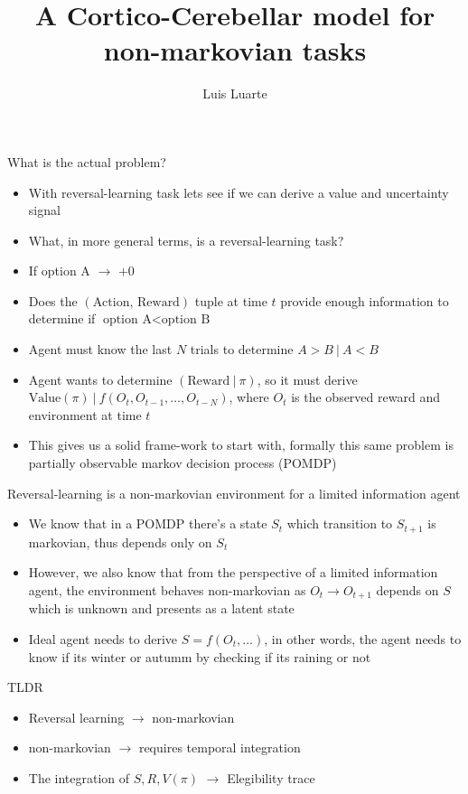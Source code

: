 \documentclass{beamer}
\title{A Cortico-Cerebellar model for non-markovian tasks}
\author{Luis Luarte}
\institute{UDD}
\begin{document}
	\frame{\titlepage}
	
	\begin{frame}{What is the actual problem?}
		\begin{itemize}
			\item With reversal-learning task lets see if we can derive a value and uncertainty signal
			\item What, in more general terms, is a reversal-learning task?
			\item If option A $\rightarrow$ $+0$
			\item Does the $(\text{Action, Reward})$ tuple at time $t$ provide enough information to determine if $\text{option A} < \text{option B}$
			\item Agent must know the last $N$ trials to determine $A > B \ | \ A < B$
			\item Agent wants to determine $(\text{Reward} \ | \ \pi)$, so it must derive $\text{Value}(\pi) \ | \ f(O_{t}, O_{t-1}, \dots, O_{t - N})$, where $O_{t}$ is the observed reward and environment at time $t$
			\item This gives us a solid frame-work to start with, formally this same problem is partially observable markov decision process (POMDP)
		\end{itemize}
	\end{frame}
	
	\begin{frame}{Reversal-learning is a non-markovian environment for a limited information agent}
		\begin{itemize}
			\item We know that in a POMDP there's a state $S_{t}$ which transition to $S_{t+1}$ is markovian, thus depends only on $S_{t}$
			\item However, we also know that from the perspective of a limited information agent, the environment behaves non-markovian as $O_{t} \rightarrow O_{t+1}$ depends on $S$ which is unknown and presents as a latent state
			\item Ideal agent needs to derive $S = f(O_{t}, \dots)$, in other words, the agent needs to know if its winter or autumm by checking if its raining or not
		\end{itemize}
		
		\begin{block}{TLDR}
			\begin{itemize}
				\item Reversal learning $\rightarrow$ non-markovian
				\item non-markovian $\rightarrow$ requires temporal integration
				\item The integration of $S, R, V(\pi)$ $\rightarrow$ Elegibility trace
			\end{itemize}
		\end{block}
	\end{frame}
	
\end{document}
